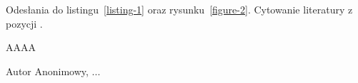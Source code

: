 \documentclass[12pt]{book}
\begin{document}
%
%
%
%
%
%
%


Odesłania do listingu~\ref{listing-1} oraz rysunku~\ref{figure-2}.
Cytowanie literatury z pozycji \cite[Twierdzenie~1.2]{AA1}.

\listoffigures

\listoftables

\listofcodes


\newpage

\frenchspacing
\begin{thebibliography}{AAAA}

 Autor Anonimowy, ...


\end{thebibliography}

\newpage
{}
\printindex
\end{document}
